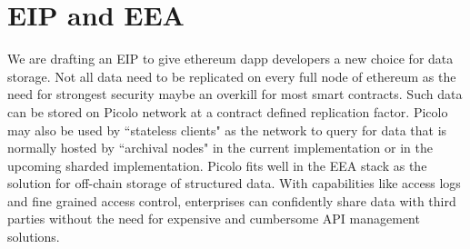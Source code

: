 \documentclass[preprint,12pt]{elsarticle}
\begin{document}
\section{EIP and EEA}
We are drafting an EIP to give ethereum dapp developers a new choice for data storage. Not all data need to be replicated on every full node of ethereum as the need for strongest security maybe an overkill for most smart contracts. Such data can be stored on Picolo network at a contract defined replication factor. Picolo may also be used by ``stateless clients" as the network to query for data that is normally hosted by ``archival nodes" in the current implementation or in the upcoming sharded implementation.
\newline\newline
Picolo fits well in the EEA stack as the solution for off-chain storage of structured data. With capabilities like access logs and fine grained access control, enterprises can confidently share data with third parties without the need for expensive and cumbersome API management solutions.
\end{document}
